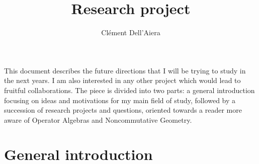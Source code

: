 \documentclass[a4paper]{article}
\title{Research project}
\date{}
\author{ Cl\'ement Dell'Aiera}
\begin{document}
\maketitle
This document describes the future directions that I will be trying to study in the next years. I am also interested in any other project which would lead to fruitful collaborations. The piece is divided into two parts: a general introduction focusing on ideas and motivations for my main field of study, followed by a succession of research projects and questions, oriented towards a reader more aware of Operator Algebras and Noncommutative Geometry. 

\section{General introduction}





 
\end{document}
